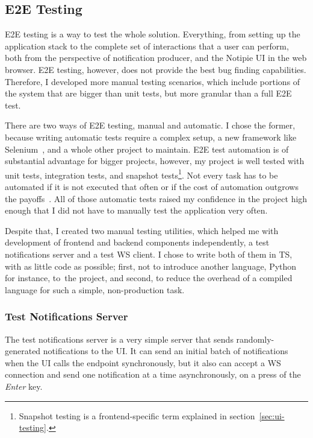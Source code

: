 \subsection{E2E Testing}\label{sec:e2e-testing}

\ac{E2E} testing is a way to test the whole solution.
Everything,
from setting up the application stack
to the complete set of interactions
that a user can perform,
both from the perspective of notification producer,
and the Notipie \ac{UI} in the web browser.
\ac{E2E} testing, however, does not provide
the best bug finding capabilities.
Therefore,
I developed more manual testing scenarios,
which include portions of the system
that are bigger than unit tests,
but more granular than a full \ac{E2E} test.

There are two ways of \ac{E2E} testing,
manual and automatic.
I chose the former,
because writing automatic tests
require a complex setup,
a new framework like Selenium~\cite{steward_selenium_2022},
and a whole other project to maintain.
\ac{E2E} test automation is of substantial advantage
for bigger projects, however,
my project is well tested with
unit tests,
integration tests, and
snapshot tests\footnote{
  Snapshot testing is a frontend-specific term
  explained in section~\ref{sec:ui-testing}.
}.
Not every task has to be automated
if it is not executed that often
or if the cost of automation outgrows
the payoffs~\cite{millett_patterns_2015}.
All of those automatic tests
raised my confidence in the project high enough
that I did not have to manually test
the application very often.

Despite that,
I created two manual testing utilities,
which helped me with development
of frontend and backend components independently,
a test notifications server
and a test \ac{WS} client.
I chose to write both of them in \ac{TS},
with as little code as possible;
first,
not to introduce another language,
Python for instance,
to~the project,
and second,
to reduce the overhead
of a compiled language
for such a simple,
non-production task.

\subsubsection{Test Notifications Server}\label{sec:test-notifications-server}

The test notifications server
is a very simple server that sends
randomly-gene\-rated notifications to the \ac{UI}.
It can send an initial batch of notifications
when the \ac{UI} calls the endpoint synchronously,
but it also can accept a \ac{WS} connection
and send one notification at a time asynchronously,
on a press of the \textit{Enter} key.

